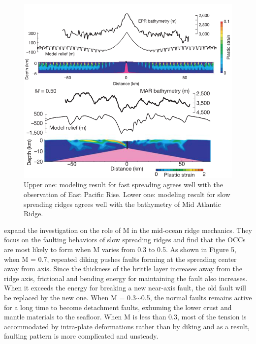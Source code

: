 \begin{figure}[H]
 \centering
  \includegraphics[scale=0.7]{./Figures/fig_Intro5_1.png}
 \caption{\small{Upper one: modeling result for fast spreading agrees well with the observation of East Pacific Rise. Lower one: modeling result for slow spreading ridges agrees well with the bathymetry of Mid Atlantic Ridge. \citep{Buck2005}}}
 \label{fig_Intro5_1}
\end{figure}
\citet{Tucholke2008} expand the investigation on the role of M in the mid-ocean ridge mechanics. They focus on the faulting behaviors of slow spreading ridges and find that the OCCs are most likely to form when M varies from 0.3 to 0.5. As shown in Figure 5, when M = 0.7, repeated diking pushes faults forming at the spreading center away from axis. Since the thickness of the brittle layer increases away from the ridge axis, frictional and bending energy for maintaining the fault also increases. When it exceeds the energy for breaking a new near-axis fault, the old fault will be replaced by the new one. When M = 0.3$\sim$0.5, the normal faults remains active for a long time to become detachment faults, exhuming the lower crust and mantle materials to the seafloor. When M is less than 0.3, most of the tension is accommodated by intra-plate deformations rather than by diking and as a result, faulting pattern is more complicated and unsteady.

